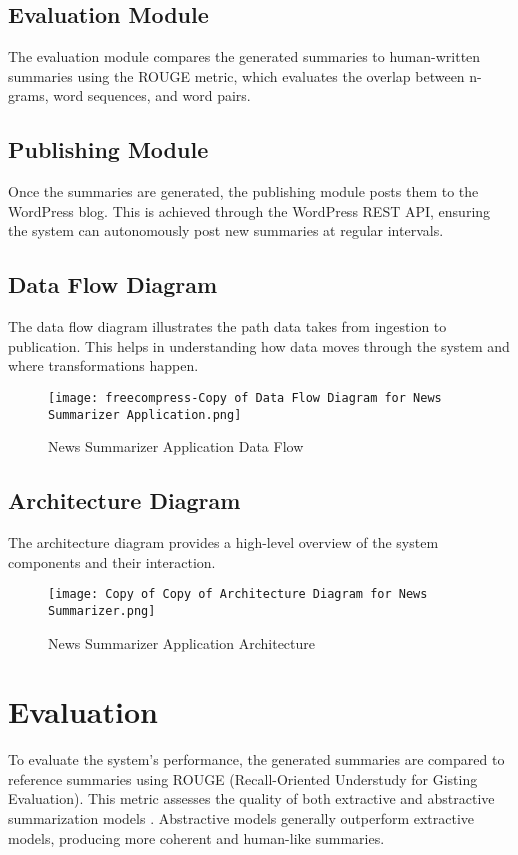 \documentclass[12pt]{article}
\begin{document}
\subsection{Evaluation Module}
The evaluation module compares the generated summaries to human-written summaries using the ROUGE metric, which evaluates the overlap between n-grams, word sequences, and word pairs.

\subsection{Publishing Module}
Once the summaries are generated, the publishing module posts them to the WordPress blog. This is achieved through the WordPress REST API, ensuring the system can autonomously post new summaries at regular intervals.

\subsection{Data Flow Diagram}
The data flow diagram illustrates the path data takes from ingestion to publication. This helps in understanding how data moves through the system and where transformations happen.

\begin{figure}[htbp]
    \centering
    \texttt{[image: freecompress-Copy of Data Flow Diagram for News Summarizer Application.png]}
    \caption{News Summarizer Application Data Flow}
    \label{fig:dataflow}
\end{figure}

\subsection{Architecture Diagram}
The architecture diagram provides a high-level overview of the system components and their interaction.

\begin{figure}[htbp]
    \centering
    \texttt{[image: Copy of Copy of Architecture Diagram for News Summarizer.png]}
    \caption{News Summarizer Application Architecture}
    \label{fig:architecture}
\end{figure}
\newpage
\section{Evaluation}
To evaluate the system's performance, the generated summaries are compared to reference summaries using ROUGE (Recall-Oriented Understudy for Gisting Evaluation). This metric assesses the quality of both extractive and abstractive summarization models \citep{raffel2020exploring}. Abstractive models generally outperform extractive models, producing more coherent and human-like summaries. 
\end{document}
